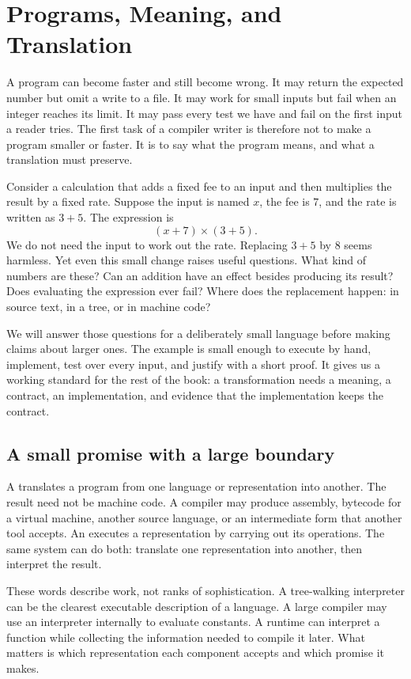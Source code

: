 \chapter{Programs, Meaning, and Translation}
\label{ch:programs-meaning-translation}

A program can become faster and still become wrong.
It may return the expected number but omit a write to a file.
It may work for small inputs but fail when an integer reaches its limit.
It may pass every test we have and fail on the first input a reader tries.
The first task of a compiler writer is therefore not to make a program smaller or faster.
It is to say what the program means, and what a translation must preserve.

Consider a calculation that adds a fixed fee to an input and then multiplies the result by a fixed rate.
Suppose the input is named $x$, the fee is $7$, and the rate is written as $3+5$.
The expression is
\[
  (x+7)\times(3+5).
\]
We do not need the input to work out the rate.
Replacing $3+5$ by $8$ seems harmless.
Yet even this small change raises useful questions.
What kind of numbers are these?
Can an addition have an effect besides producing its result?
Does evaluating the expression ever fail?
Where does the replacement happen: in source text, in a tree, or in machine code?

We will answer those questions for a deliberately small language before making claims about larger ones.
The example is small enough to execute by hand, implement, test over every input, and justify with a short proof.
It gives us a working standard for the rest of the book: a transformation needs a meaning, a contract, an implementation, and evidence that the implementation keeps the contract.

\section{A small promise with a large boundary}
\label{sec:translation-promise}

A  translates a program from one language or representation into another.
The result need not be machine code.
A compiler may produce assembly, bytecode for a virtual machine, another source language, or an intermediate form that another tool accepts.
An  executes a representation by carrying out its operations.
The same system can do both: translate one representation into another, then interpret the result.

These words describe work, not ranks of sophistication.
A tree-walking interpreter can be the clearest executable description of a language.
A large compiler may use an interpreter internally to evaluate constants.
A runtime can interpret a function while collecting the information needed to compile it later.
What matters is which representation each component accepts and which promise it makes.


